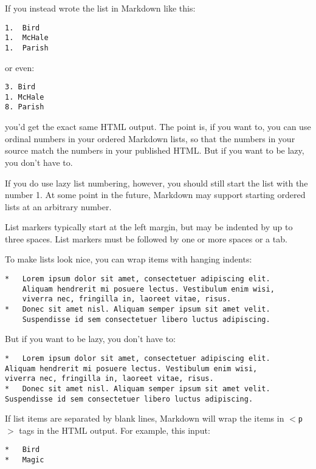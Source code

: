 If you instead wrote the list in Markdown like this:

\begin{verbatim}
1.  Bird
1.  McHale
1.  Parish
\end{verbatim}

or even:

\begin{verbatim}
3. Bird
1. McHale
8. Parish
\end{verbatim}

you'd get the exact same HTML output. The point is, if you want to,
you can use ordinal numbers in your ordered Markdown lists, so that
the numbers in your source match the numbers in your published HTML.
But if you want to be lazy, you don't have to.

If you do use lazy list numbering, however, you should still start the
list with the number 1. At some point in the future, Markdown may support
starting ordered lists at an arbitrary number.

List markers typically start at the left margin, but may be indented by
up to three spaces. List markers must be followed by one or more spaces
or a tab.

To make lists look nice, you can wrap items with hanging indents:

\begin{verbatim}
*   Lorem ipsum dolor sit amet, consectetuer adipiscing elit.
    Aliquam hendrerit mi posuere lectus. Vestibulum enim wisi,
    viverra nec, fringilla in, laoreet vitae, risus.
*   Donec sit amet nisl. Aliquam semper ipsum sit amet velit.
    Suspendisse id sem consectetuer libero luctus adipiscing.
\end{verbatim}

But if you want to be lazy, you don't have to:

\begin{verbatim}
*   Lorem ipsum dolor sit amet, consectetuer adipiscing elit.
Aliquam hendrerit mi posuere lectus. Vestibulum enim wisi,
viverra nec, fringilla in, laoreet vitae, risus.
*   Donec sit amet nisl. Aliquam semper ipsum sit amet velit.
Suspendisse id sem consectetuer libero luctus adipiscing.
\end{verbatim}

If list items are separated by blank lines, Markdown will wrap the
items in \texttt{$<$p$>$} tags in the HTML output. For example, this input:

\begin{verbatim}
*   Bird
*   Magic
\end{verbatim}

